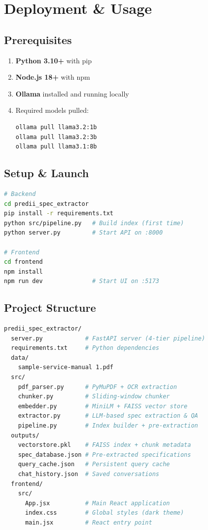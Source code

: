 \documentclass[12pt, a4paper]{article}
\begin{document}
\section{Deployment \& Usage}

\subsection{Prerequisites}

\begin{enumerate}[itemsep=2pt]
  \item \textbf{Python 3.10+} with pip
  \item \textbf{Node.js 18+} with npm
  \item \textbf{Ollama} installed and running locally
  \item Required models pulled:
\begin{lstlisting}[language=bash]
ollama pull llama3.2:1b
ollama pull llama3.2:3b
ollama pull llama3.1:8b
\end{lstlisting}
\end{enumerate}

\subsection{Setup \& Launch}

\begin{lstlisting}[language=bash, caption={Server startup commands}]
# Backend
cd predii_spec_extractor
pip install -r requirements.txt
python src/pipeline.py   # Build index (first time)
python server.py         # Start API on :8000

# Frontend
cd frontend
npm install
npm run dev              # Start UI on :5173
\end{lstlisting}

\subsection{Project Structure}

\begin{lstlisting}[language=bash, caption={Directory layout}]
predii_spec_extractor/
  server.py            # FastAPI server (4-tier pipeline)
  requirements.txt     # Python dependencies
  data/
    sample-service-manual 1.pdf
  src/
    pdf_parser.py      # PyMuPDF + OCR extraction
    chunker.py         # Sliding-window chunker
    embedder.py        # MiniLM + FAISS vector store
    extractor.py       # LLM-based spec extraction & QA
    pipeline.py        # Index builder + pre-extraction
  outputs/
    vectorstore.pkl    # FAISS index + chunk metadata
    spec_database.json # Pre-extracted specifications
    query_cache.json   # Persistent query cache
    chat_history.json  # Saved conversations
  frontend/
    src/
      App.jsx          # Main React application
      index.css        # Global styles (dark theme)
      main.jsx         # React entry point
\end{lstlisting}
\end{document}
